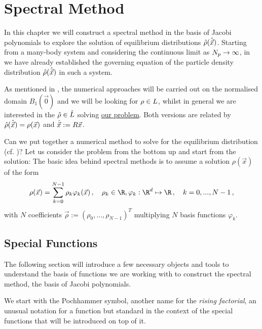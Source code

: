 \chapter{Spectral Method}
\label{chap:spectral-method}

% 

In this chapter we will construct a spectral method in the basis of Jacobi polynomials to explore the solution of equilibrium distributions $\hat{\rho}(\hat{\vec{x}})$.
Starting from a many-body system and considering the continuous limit as $N_p \rightarrow \infty$, in  we have already established the governing equation of the particle density distribution $\hat{\rho}(\hat{\vec{x}})$ in such a system.

As mentioned in , the numerical approaches will be carried out on the normalised domain $B_1(\vec{0})$ and we will be looking for $\rho \in L$, whilst in general we are interested in the $\hat{\rho} \in \hat{L}$ solving \href{def:the-problem}{our problem}.
Both versions are related by $\hat{\rho}(\hat{\vec{x}}) = \rho(\vec{x})$ and $\hat{\vec{x}} := R \vec{x}$.

Can we put together a numerical method to solve for the equilibrium distribution (cf. )?
Let us consider the problem from the bottom up and start from the solution:
The basic idea behind spectral methods is to assume a solution $\rho(\vec{x})$ of the form
$$\rho(\vec{x}) = \sum_{k=0}^{N-1} \rho_k \varphi_k(\vec{x})\,,\quad \rho_k \in \R, \varphi_k: \R^d \mapsto \R\,,\quad k = 0, ..., N-1\,,$$
with $N$ coefficients $\vec{\rho} := \left(\rho_0, ..., \rho_{N-1}\right)^T$ multiplying $N$ basis functions $\varphi_k$.

\pagebreak
\section{Special Functions}
The following section will introduce a few necessary objects and tools to understand the basis of functions we are working with to construct the spectral method, the basis of Jacobi polynomials.

We start with the Pochhammer symbol, another name for the \textit{rising factorial}, an unusual notation for a function but standard in the context of the special functions that will be introduced on top of it.


